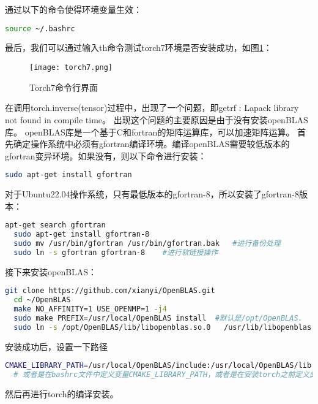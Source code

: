\documentclass[lang=cn,a4paper,newtx]{elegantpaper}
\begin{document}
通过以下的命令使得环境变量生效：
\begin{lstlisting}[language=bash]
  source ~/.bashrc
\end{lstlisting}

最后，我们可以通过输入th命令测试torch7环境是否安装成功，如图\ref{fig:torch7_terminal}：
\begin{figure}[hbpt]
  \centering
  \texttt{[image: torch7.png]}
  \caption{Torch7命令行界面}
  \label{fig:torch7_terminal}
\end{figure}

在调用torch.inverse(tensor)过程中，出现了一个问题，即getrf : Lapack library not found in compile time。
出现这个问题的主要原因是由于没有安装openBLAS库。
openBLAS库是一个基于C和fortran的矩阵运算库，可以加速矩阵运算。
首先确定操作系统中必须有gfortran编译环境。编译openBLAS需要较低版本的gfortran变异环境。如果没有，则以下命令进行安装：
\begin{lstlisting}[language=bash]
  sudo apt-get install gfortran
\end{lstlisting}

对于Ubuntu22.04操作系统，只有最低版本的gfortran-8，所以安装了gfortran-8版本：
\begin{lstlisting}[language=bash]
  apt-get search gfortran
  sudo apt-get install gfortran-8
  sudo mv /usr/bin/gfortran /usr/bin/gfortran.bak	#进行备份处理
  sudo ln -s gfortran gfortran-8	#进行软链接操作 
\end{lstlisting}

接下来安装openBLAS：

\begin{lstlisting}[language=bash]
  git clone https://github.com/xianyi/OpenBLAS.git
  cd ~/OpenBLAS
  make NO_AFFINITY=1 USE_OPENMP=1 -j4
  sudo make PREFIX=/usr/local/OpenBLAS install  #默认是/opt/OpenBLAS.
  sudo ln -s /opt/OpenBLAS/lib/libopenblas.so.0   /usr/lib/libopenblas.so.0
\end{lstlisting}

安装成功后，设置一下路径
\begin{lstlisting}[language=bash]
  CMAKE_LIBRARY_PATH=/usr/local/OpenBLAS/include:/usr/local/OpenBLAS/lib:$CMAKE_LIBRARY_PATH
  # 或者是在bashrc文件中定义变量CMAKE_LIBRARY_PATH，或者是在安装torch之前定义此变量值
\end{lstlisting}

然后再进行torch的编译安装。
\end{document}
